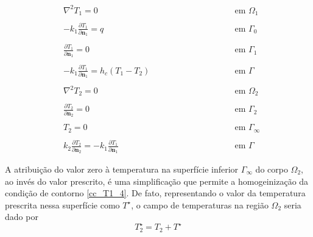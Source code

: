 \begin{subequations}
\begin{alignat}{2}
	& \nabla^2 T_1 = 0 \quad\quad\quad\quad\quad && \text{ em } \Omega_1 \label{harm_T1} \\ \nonumber \\
	& -k_1 \frac{\partial T_1}{\partial\mathbf{n}_1} = q && \text{ em } \Gamma_0  \label{cc_T1_2} \\ \nonumber \\
	& \frac{\partial T_1}{\partial \mathbf{n}_1} = 0 && \text{ em }  \Gamma_1 \label{cc_T1_1} \\ \nonumber \\
	& -k_1 \frac{\partial T_1}{\partial\mathbf{n}_1} = h_c(T_1-T_2) \quad\quad\quad\quad\quad\quad\quad\quad && \text{ em }  \Gamma \label{cc_grad_T1} \\ \nonumber \\
	& \nabla^2 T_2 = 0 && \text{ em }  \Omega_2 \label{harm_T2} \\ \nonumber \\
	& \frac{\partial T_2}{\partial \mathbf{n}_2} = 0 && \text{ em }  \Gamma_2 \label{cc_T1_3} \\ \nonumber \\
	& T_2 = 0 && \text{ em }  \Gamma_\infty \label{cc_T1_4} \\ \nonumber \\
	& k_2\frac{\partial T_2}{\partial\mathbf{n}_2} = - k_1\frac{\partial T_1}{\partial\mathbf{n}_1} && \text{ em }  \Gamma \label{cc_T1_5}
\end{alignat}
\end{subequations}

A atribuição do valor zero à temperatura na superfície inferior $\Gamma_\infty$ do corpo $\Omega_2$, ao invés do valor prescrito, é uma simplificação
que permite a homogeinização da condição de contorno \eqref{cc_T1_4}. De fato, representando o valor da temperatura prescrita nessa superfície como $T^\star$,
o campo de temperaturas na região $\Omega_2$ seria dado por
\begin{equation}
	T_2^\star = T_2 + T^\star
\end{equation}
